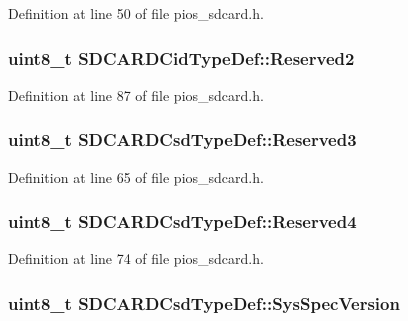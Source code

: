 \-Definition at line 50 of file pios\-\_\-sdcard.\-h.

\hypertarget{group___p_i_o_s___s_d_c_a_r_d_gab50b795387215c00e5d9b5feb7e9aefb}{
\subsubsection[{\-Reserved2}]{\setlength{\rightskip}{0pt plus 5cm}uint8\-\_\-t {\bf \-S\-D\-C\-A\-R\-D\-Cid\-Type\-Def\-::\-Reserved2}}}\label{group___p_i_o_s___s_d_c_a_r_d_gab50b795387215c00e5d9b5feb7e9aefb}


\-Definition at line 87 of file pios\-\_\-sdcard.\-h.

\hypertarget{group___p_i_o_s___s_d_c_a_r_d_ga2912ee762425a05b026c2c66039b859b}{
\subsubsection[{\-Reserved3}]{\setlength{\rightskip}{0pt plus 5cm}uint8\-\_\-t {\bf \-S\-D\-C\-A\-R\-D\-Csd\-Type\-Def\-::\-Reserved3}}}\label{group___p_i_o_s___s_d_c_a_r_d_ga2912ee762425a05b026c2c66039b859b}


\-Definition at line 65 of file pios\-\_\-sdcard.\-h.

\hypertarget{group___p_i_o_s___s_d_c_a_r_d_ga2154190e5c6f32ce3b67bdc4a9aa3982}{
\subsubsection[{\-Reserved4}]{\setlength{\rightskip}{0pt plus 5cm}uint8\-\_\-t {\bf \-S\-D\-C\-A\-R\-D\-Csd\-Type\-Def\-::\-Reserved4}}}\label{group___p_i_o_s___s_d_c_a_r_d_ga2154190e5c6f32ce3b67bdc4a9aa3982}


\-Definition at line 74 of file pios\-\_\-sdcard.\-h.

\hypertarget{group___p_i_o_s___s_d_c_a_r_d_ga68ba16a5f115dc00b88d70d6912a1c45}{
\subsubsection[{\-Sys\-Spec\-Version}]{\setlength{\rightskip}{0pt plus 5cm}uint8\-\_\-t {\bf \-S\-D\-C\-A\-R\-D\-Csd\-Type\-Def\-::\-Sys\-Spec\-Version}}}\label{group___p_i_o_s___s_d_c_a_r_d_ga68ba16a5f115dc00b88d70d6912a1c45}


